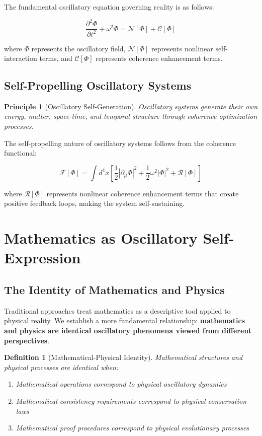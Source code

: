 \documentclass[11pt]{article}
\newtheorem{definition}[theorem]{Definition}
\newtheorem{principle}[theorem]{Principle}
\theoremstyle{remark}
\begin{document}
The fundamental oscillatory equation governing reality is as follows:

$$\frac{\partial^2 \Phi}{\partial t^2} + \omega^2 \Phi = \mathcal{N}[\Phi] + \mathcal{C}[\Phi]$$

where $\Phi$ represents the oscillatory field, $\mathcal{N}[\Phi]$ represents nonlinear self-interaction terms, and $\mathcal{C}[\Phi]$ represents coherence enhancement terms.

\subsection{Self-Propelling Oscillatory Systems}

\begin{principle}[Oscillatory Self-Generation]
Oscillatory systems generate their own energy, matter, space-time, and temporal structure through coherence optimization processes.
\end{principle}

The self-propelling nature of oscillatory systems follows from the coherence functional:

$$\mathcal{F}[\Phi] = \int d^4x \left[\frac{1}{2}|\partial_\mu \Phi|^2 + \frac{1}{2}\omega^2|\Phi|^2 + \mathcal{R}[\Phi]\right]$$

where $\mathcal{R}[\Phi]$ represents nonlinear coherence enhancement terms that create positive feedback loops, making the system self-sustaining.

\section{Mathematics as Oscillatory Self-Expression}

\subsection{The Identity of Mathematics and Physics}

Traditional approaches treat mathematics as a descriptive tool applied to physical reality. We establish a more fundamental relationship: \textbf{mathematics and physics are identical oscillatory phenomena viewed from different perspectives}.

\begin{definition}[Mathematical-Physical Identity]
Mathematical structures and physical processes are identical when:
\begin{enumerate}
\item Mathematical operations correspond to physical oscillatory dynamics
\item Mathematical consistency requirements correspond to physical conservation laws
\item Mathematical proof procedures correspond to physical evolutionary processes
\end{enumerate}
\end{definition}
\end{document}
